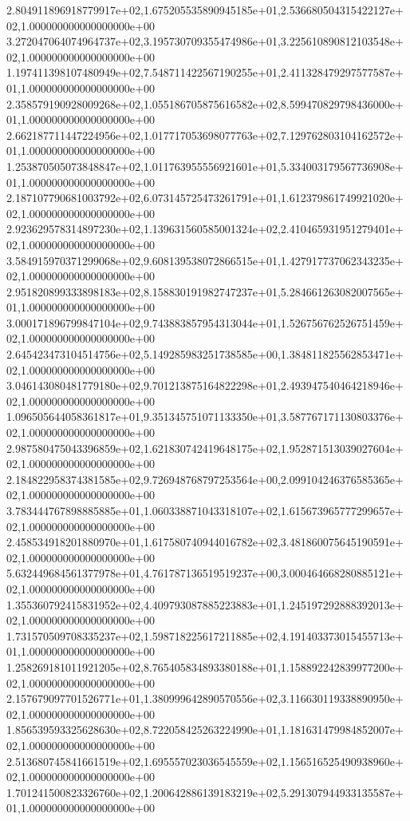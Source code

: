 2.804911896918779917e+02,1.675205535890945185e+01,2.536680504315422127e+02,1.000000000000000000e+00
3.272047064074964737e+02,3.195730709355474986e+01,3.225610890812103548e+02,1.000000000000000000e+00
1.197411398107480949e+02,7.548711422567190255e+01,2.411328479297577587e+01,1.000000000000000000e+00
2.358579190928009268e+02,1.055186705875616582e+02,8.599470829798436000e+01,1.000000000000000000e+00
2.662187711447224956e+02,1.017717053698077763e+02,7.129762803104162572e+01,1.000000000000000000e+00
1.253870505073848847e+02,1.011763955556921601e+01,5.334003179567736908e+01,1.000000000000000000e+00
2.187107790681003792e+02,6.073145725473261791e+01,1.612379861749921020e+02,1.000000000000000000e+00
2.923629578314897230e+02,1.139631560585001324e+02,2.410465931951279401e+02,1.000000000000000000e+00
3.584915970371299068e+02,9.608139538072866515e+01,1.427917737062343235e+02,1.000000000000000000e+00
2.951820899333898183e+02,8.158830191982747237e+01,5.284661263082007565e+01,1.000000000000000000e+00
3.000171896799847104e+02,9.743883857954313044e+01,1.526756762526751459e+02,1.000000000000000000e+00
2.645423473104514756e+02,5.149285983251738585e+00,1.384811825562853471e+02,1.000000000000000000e+00
3.046143080481779180e+02,9.701213875164822298e+01,2.493947540464218946e+02,1.000000000000000000e+00
1.096505644058361817e+01,9.351345751071133350e+01,3.587767171130803376e+02,1.000000000000000000e+00
2.987580475043396859e+02,1.621830742419648175e+02,1.952871513039027604e+02,1.000000000000000000e+00
2.184822958374381585e+02,9.726948768797253564e+00,2.099104246376585365e+02,1.000000000000000000e+00
3.783444767898885885e+01,1.060338871043318107e+02,1.615673965777299657e+02,1.000000000000000000e+00
2.458534918201880970e+01,1.617580740944016782e+02,3.481860075645190591e+02,1.000000000000000000e+00
5.632449684561377978e+01,4.761787136519519237e+00,3.000464668280885121e+02,1.000000000000000000e+00
1.355360792415831952e+02,4.409793087885223883e+01,1.245197292888392013e+02,1.000000000000000000e+00
1.731570509708335237e+02,1.598718225617211885e+02,4.191403373015455713e+01,1.000000000000000000e+00
1.258269181011921205e+02,8.765405834893380188e+01,1.158892242839977200e+02,1.000000000000000000e+00
2.157679097701526771e+01,1.380999642890570556e+02,3.116630119338890950e+02,1.000000000000000000e+00
1.856539593325628630e+02,8.722058425263224990e+01,1.181631479984852007e+02,1.000000000000000000e+00
2.513680745841661519e+02,1.695557023036545559e+02,1.156516525490938960e+02,1.000000000000000000e+00
1.701241500823326760e+02,1.200642886139183219e+02,5.291307944933135587e+01,1.000000000000000000e+00
